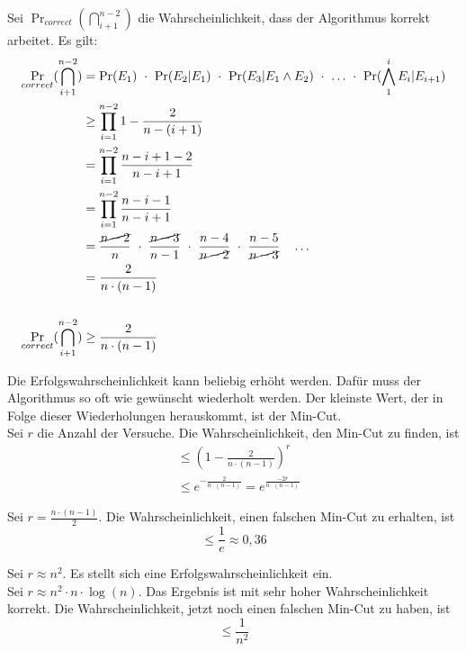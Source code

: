 \documentclass{scrartcl}%
\begin{document}
    Sei $\Pr_{correct}(\bigcap_{i+1}^{n-2})$ die Wahrscheinlichkeit, dass der Algorithmus korrekt arbeitet.
    Es gilt:
    \begin{align*}
        \Pr_{correct}(\bigcap_{i+1}^{n-2}) & =
        \Pr(E_1)\ \cdot\
        \Pr(E_2|E_1)\ \cdot\
        \Pr(E_3| E_1 \land E_2)\ \cdot\ \dots\ \cdot\
        \Pr(\bigwedge_{1}^i E_i|E_{i+1}) \\
        & \geq \prod_{i=1}^{n-2}1-\frac{2}{n - (i+1)} \\
        & = \prod_{i=1}^{n-2}\frac{n-i+1-2}{n-i+1} \\
        & = \prod_{i=1}^{n-2}\frac{n-i-1}{n-i+1} \\
        & = \frac{\cancel{n-2}}{n}\ \cdot\
        \frac{\cancel{n-3}}{n-1}\ \cdot\
        \frac{n-4}{\cancel{n-2}}\ \cdot\
        \frac{n-5}{\cancel{n-3}} \quad\dots \\
        & = \frac{2}{n \cdot (n-1)} \\
        & \\
        \Pr_{correct}(\bigcap_{i+1}^{n-2}) & \geq \frac{2}{n \cdot (n-1)}
    \end{align*}

    Die Erfolgswahrscheinlichkeit kann beliebig erhöht werden.
    Dafür muss der Algorithmus so oft wie gewünscht wiederholt werden.
    Der kleinste Wert, der in Folge dieser Wiederholungen herauskommt, ist der Min-Cut.\\

    Sei $r$ die Anzahl der Versuche.
    Die Wahrscheinlichkeit,  den Min-Cut zu finden, ist
    \begin{align*}
        & \leq (1 - \frac{2}{n \cdot (n-1)})^r \\
        & \leq e^{-\frac{2}{n \cdot (n-1)}} = e^{\frac{-2r}{n \cdot (n-1)}}
    \end{align*}

    Sei $r = \frac{n \cdot (n-1)}{2}$.
    Die Wahrscheinlichkeit, einen falschen Min-Cut zu erhalten, ist
    \begin{equation*}
        \leq \frac{1}{e} \approx 0,36
    \end{equation*}

    Sei $r \approx n^2$. Es stellt sich eine  Erfolgswahrscheinlichkeit ein.\\

    Sei $r \approx n^2 \cdot n \cdot \log(n)$.
    Das Ergebnis ist mit sehr hoher Wahrscheinlichkeit korrekt.
    Die Wahrscheinlichkeit, jetzt noch einen falschen Min-Cut zu haben, ist
    \begin{equation*}
        \leq \frac{1}{n^2}
    \end{equation*}
\end{document}
